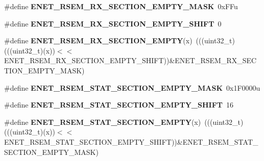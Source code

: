\begin{DoxyCompactItemize}
\item 
\#define {\bfseries E\+N\+E\+T\+\_\+\+R\+S\+E\+M\+\_\+\+R\+X\+\_\+\+S\+E\+C\+T\+I\+O\+N\+\_\+\+E\+M\+P\+T\+Y\+\_\+\+M\+A\+SK}~0x\+F\+Fu\hypertarget{group__ENET__Register__Masks_ga7efbed880ef6db92d0b5afa9584e4a55}{}\label{group__ENET__Register__Masks_ga7efbed880ef6db92d0b5afa9584e4a55}

\item 
\#define {\bfseries E\+N\+E\+T\+\_\+\+R\+S\+E\+M\+\_\+\+R\+X\+\_\+\+S\+E\+C\+T\+I\+O\+N\+\_\+\+E\+M\+P\+T\+Y\+\_\+\+S\+H\+I\+FT}~0\hypertarget{group__ENET__Register__Masks_gabd36b25a63e3ac019e1d718bb419f6b0}{}\label{group__ENET__Register__Masks_gabd36b25a63e3ac019e1d718bb419f6b0}

\item 
\#define {\bfseries E\+N\+E\+T\+\_\+\+R\+S\+E\+M\+\_\+\+R\+X\+\_\+\+S\+E\+C\+T\+I\+O\+N\+\_\+\+E\+M\+P\+TY}(x)~(((uint32\+\_\+t)(((uint32\+\_\+t)(x))$<$$<$E\+N\+E\+T\+\_\+\+R\+S\+E\+M\+\_\+\+R\+X\+\_\+\+S\+E\+C\+T\+I\+O\+N\+\_\+\+E\+M\+P\+T\+Y\+\_\+\+S\+H\+I\+FT))\&E\+N\+E\+T\+\_\+\+R\+S\+E\+M\+\_\+\+R\+X\+\_\+\+S\+E\+C\+T\+I\+O\+N\+\_\+\+E\+M\+P\+T\+Y\+\_\+\+M\+A\+SK)\hypertarget{group__ENET__Register__Masks_gac9332cfad9880fac4809423931950e77}{}\label{group__ENET__Register__Masks_gac9332cfad9880fac4809423931950e77}

\item 
\#define {\bfseries E\+N\+E\+T\+\_\+\+R\+S\+E\+M\+\_\+\+S\+T\+A\+T\+\_\+\+S\+E\+C\+T\+I\+O\+N\+\_\+\+E\+M\+P\+T\+Y\+\_\+\+M\+A\+SK}~0x1\+F0000u\hypertarget{group__ENET__Register__Masks_ga2c9b27e42f02634896fac03a23270054}{}\label{group__ENET__Register__Masks_ga2c9b27e42f02634896fac03a23270054}

\item 
\#define {\bfseries E\+N\+E\+T\+\_\+\+R\+S\+E\+M\+\_\+\+S\+T\+A\+T\+\_\+\+S\+E\+C\+T\+I\+O\+N\+\_\+\+E\+M\+P\+T\+Y\+\_\+\+S\+H\+I\+FT}~16\hypertarget{group__ENET__Register__Masks_ga4f6252fe71d82a4e4085cd0acf6893f8}{}\label{group__ENET__Register__Masks_ga4f6252fe71d82a4e4085cd0acf6893f8}

\item 
\#define {\bfseries E\+N\+E\+T\+\_\+\+R\+S\+E\+M\+\_\+\+S\+T\+A\+T\+\_\+\+S\+E\+C\+T\+I\+O\+N\+\_\+\+E\+M\+P\+TY}(x)~(((uint32\+\_\+t)(((uint32\+\_\+t)(x))$<$$<$E\+N\+E\+T\+\_\+\+R\+S\+E\+M\+\_\+\+S\+T\+A\+T\+\_\+\+S\+E\+C\+T\+I\+O\+N\+\_\+\+E\+M\+P\+T\+Y\+\_\+\+S\+H\+I\+FT))\&E\+N\+E\+T\+\_\+\+R\+S\+E\+M\+\_\+\+S\+T\+A\+T\+\_\+\+S\+E\+C\+T\+I\+O\+N\+\_\+\+E\+M\+P\+T\+Y\+\_\+\+M\+A\+SK)\hypertarget{group__ENET__Register__Masks_gadc4c382b7cc6428be891cdb2ed74a688}{}\label{group__ENET__Register__Masks_gadc4c382b7cc6428be891cdb2ed74a688}


\end{DoxyCompactItemize}
